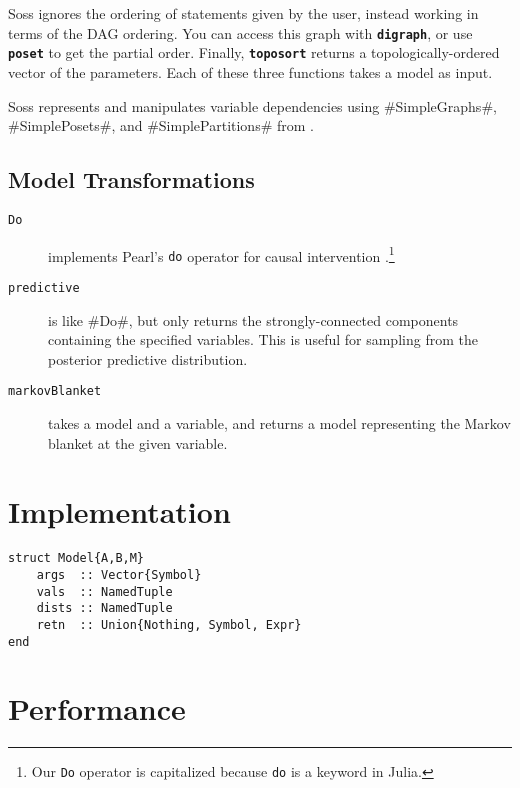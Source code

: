 \documentclass[anonymous=false, %
               format=acmsmall, %
               review=true, %
               screen=true, %
               nonacm=true]{acmart}
\begin{document}
Soss ignores the ordering of statements given by the user, instead working in terms of the DAG ordering. You can access this graph with {\bf \texttt{digraph}}, or use {\bf \texttt{poset}} to get the partial order. Finally, {\bf \texttt{toposort}} returns a topologically-ordered vector of the parameters. Each of these three functions takes a model as input.

Soss represents and manipulates variable dependencies using \jl#SimpleGraphs#, \jl#SimplePosets#, and \jl#SimplePartitions# from \cite{SimpleWorld}.


\subsection{Model Transformations}

\begin{description}
    \item[\texttt{Do}] implements Pearl's {\footnotesize\texttt{do}} operator for causal intervention \cite{Pearl1995}.\footnote{Our {\footnotesize\texttt{Do}} operator is capitalized because {\footnotesize\texttt{do}} is a keyword in Julia.}
    \item[\texttt{predictive}] is like \jl#Do#, but only returns the strongly-connected components containing the specified variables. This is useful for sampling from the posterior predictive distribution.
    \item[\texttt{markovBlanket}]  takes a model and a variable, and returns a model representing the Markov blanket at the given variable.
\end{description}

\section{Implementation}

\begin{verbatim}
struct Model{A,B,M} 
    args  :: Vector{Symbol}
    vals  :: NamedTuple
    dists :: NamedTuple
    retn  :: Union{Nothing, Symbol, Expr}
end
\end{verbatim}


\section{Performance}

\end{document}
